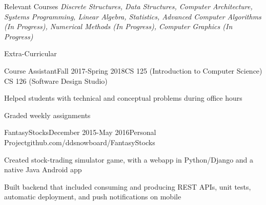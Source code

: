 \documentclass{tightResume}
\begin{document}
    \begin{rSection}{Relevant Courses}
        \textit{Discrete Structures, Data Structures, Computer Architecture, Systems Programming, Linear Algebra, Statistics, Advanced Computer Algorithms (In Progress), Numerical Methods (In Progress), Computer Graphics (In Progress)}

    \end{rSection}


    \begin{rSection}{Extra-Curricular} \itemsep -3pt
        \begin{rSubsection}{Course Assistant}{Fall 2017-Spring 2018}{CS 125 (Introduction to Computer Science) \\ CS 126 (Software Design Studio)}{}{}
        \item Helped students with technical and conceptual problems during office hours
        \item Graded weekly assignments
        \end{rSubsection}

        \begin{rSubsection}{FantasyStocks}{December 2015-May 2016}{Personal Project}{github.com/ddsnowboard/FantasyStocks}
        \item Created stock-trading simulator game, with a webapp in Python/Django and a native Java Android app
        \item Built backend that included consuming and producing REST APIs, unit tests, automatic deployment, and push notifications on mobile
        \end{rSubsection}

    \end{rSection}

    
\end{document}
